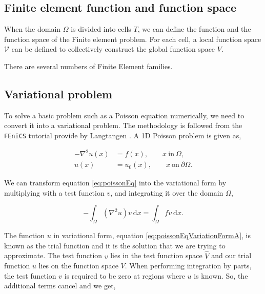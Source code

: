 \subsection*{Finite element function and function space}

When the domain $\Omega$ is divided into cells $T$, we can define the function and the function space of the Finite element problem. For each cell, a local function space $\mathcal{V}$ can be defined to collectively construct the global function space $V$.

There are several numbers of Finite Element families. 

\subsection*{Variational problem}
\label{subsec:variationalProblem}

To solve a basic problem such as a Poisson equation numerically, we need to convert it into a variational problem. The methodology is followed from the \texttt{FEniCS} tutorial provide by Langtangen \cite{Langtangen2012}. A 1D Poisson problem is given as,

	\begin{subequations}
	\begin{align*}
	- \nabla^2 u(x) &= f(x), \qquad x\ \mathrm{in}\ \Omega,\\
	u(x) &= u_0(x), \qquad x\ \mathrm{on}\ \partial\Omega.
	\end{align*}
	\label{eq:poissonEq}
	\end{subequations}
	
We can transform equation \ref{eq:poissonEq} into the variational form by multiplying with a test function $v$, and integrating it over the domain $\Omega$,


	\begin{equation}
	- \int_{\Omega} \left(\nabla^2 u\right)v\ \mathrm{d}x= \int_{\Omega} fv\ \mathrm{d}x.
	\label{eq:poissonEqVariationFormA}
	\end{equation}

The function $u$ in variational form, equation \ref{eq:poissonEqVariationFormA}, is known as the trial function and it is the solution that we are trying to approximate. The test function $v$ lies in the test function space $\hat{V}$ and our trial function $u$ lies on the function space $V$. When performing integration by parts, the test function $v$ is required to be zero at regions where $u$ is known. So, the additional terms cancel and we get,

